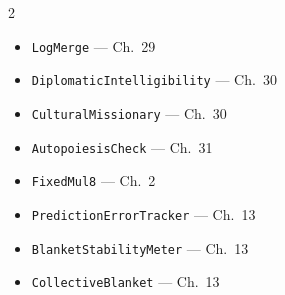 \documentclass[11pt,a4paper,openany]{book}
\theoremstyle{plain}
\theoremstyle{definition}
\theoremstyle{remark}
\begin{document}
\begin{multicols}{2}
\begin{itemize}[leftmargin=*, itemsep=0pt]
  \item \texttt{LogMerge} --- Ch.~29
  \item \texttt{DiplomaticIntelligibility} --- Ch.~30
  \item \texttt{CulturalMissionary} --- Ch.~30
  \item \texttt{AutopoiesisCheck} --- Ch.~31
  \item \texttt{FixedMul8} --- Ch.~2
  \item \texttt{PredictionErrorTracker} --- Ch.~13
  \item \texttt{BlanketStabilityMeter} --- Ch.~13
  \item \texttt{CollectiveBlanket} --- Ch.~13
\end{itemize}
\end{multicols}
\end{document}
